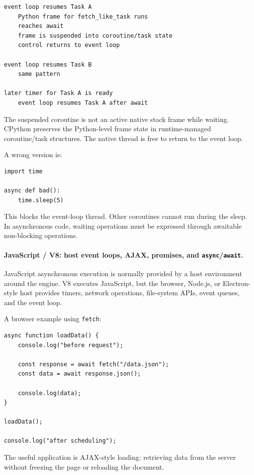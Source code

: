 \begin{verbatim}
event loop resumes Task A
    Python frame for fetch_like_task runs
    reaches await
    frame is suspended into coroutine/task state
    control returns to event loop

event loop resumes Task B
    same pattern

later timer for Task A is ready
    event loop resumes Task A after await
\end{verbatim}

The suspended coroutine is not an active native stack frame while waiting. CPython preserves the Python-level frame state in runtime-managed coroutine/task structures. The native thread is free to return to the event loop.

A wrong version is:

\begin{verbatim}
import time

async def bad():
    time.sleep(5)
\end{verbatim}

This blocks the event-loop thread. Other coroutines cannot run during the sleep. In asynchronous code, waiting operations must be expressed through awaitable non-blocking operations.

\paragraph{JavaScript / V8: host event loops, AJAX, promises, and \texttt{async}/\texttt{await}.}

JavaScript asynchronous execution is normally provided by a host environment around the engine. V8 executes JavaScript, but the browser, Node.js, or Electron-style host provides timers, network operations, file-system APIs, event queues, and the event loop.

A browser example using \texttt{fetch}:

\begin{verbatim}
async function loadData() {
    console.log("before request");

    const response = await fetch("/data.json");
    const data = await response.json();

    console.log(data);
}

loadData();

console.log("after scheduling");
\end{verbatim}

The useful application is AJAX-style loading: retrieving data from the server without freezing the page or reloading the document.

